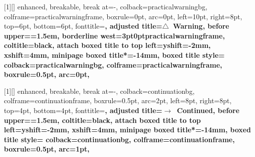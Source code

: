 %
%

\newcommand{\practicalwarningicon}{\ensuremath{\triangle}}

[1][]{%
  enhanced,
  breakable,
  break at=-\baselineskip,
  colback=practicalwarningbg,
  colframe=practicalwarningframe,
  boxrule=0pt,
  arc=0pt,
  left=10pt,
  right=8pt,
  top=6pt,
  bottom=6pt,
  fonttitle=\bfseries\sffamily,
  adjusted title={\practicalwarningicon~Warning},
  before upper={\parindent=1.5em},
  borderline west={3pt}{0pt}{practicalwarningframe},
  coltitle=black,
  attach boxed title to top left={yshift=-2mm, xshift=4mm},
  minipage boxed title*=-14mm,
  boxed title style={
    colback=practicalwarningbg,
    colframe=practicalwarningframe,
    boxrule=0.5pt,
    arc=0pt,
      }
}

%

\newcommand{\continuationicon}{\ensuremath{\rightarrow}}

[1][]{%
  enhanced,
  breakable,
  break at=-\baselineskip,
  colback=continuationbg,
  colframe=continuationframe,
  boxrule=0.5pt,
  arc=2pt,
  left=8pt,
  right=8pt,
  top=4pt,
  bottom=4pt,
  fonttitle=\bfseries\sffamily\small,
  adjusted title={\continuationicon~Continued},
  before upper={\parindent=1.5em\small},
  coltitle=black,
  attach boxed title to top left={yshift=-2mm, xshift=4mm},
  minipage boxed title*=-14mm,
  boxed title style={
    colback=continuationbg,
    colframe=continuationframe,
    boxrule=0.5pt,
    arc=1pt,
      }
}
